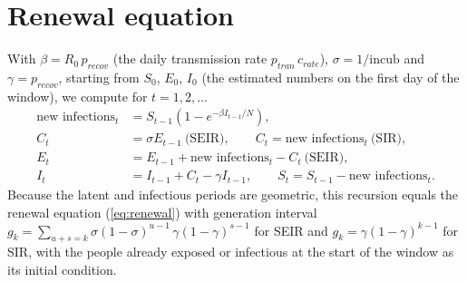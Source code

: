 \documentclass[12pt]{article}
\begin{document}
\section{Renewal equation}\label{app:renewal}

With $\beta = R_0\, p_{recov}$ (the daily transmission rate $p_{tran}\, c_{rate}$), $\sigma = 1/\text{incub}$
and $\gamma = p_{recov}$, starting from $S_0$, $E_0$, $I_0$ (the estimated numbers on the first day of the
window), we compute for $t = 1, 2, \dots$
\begin{align*}
\text{new infections}_t &= S_{t-1}\left(1 - e^{-\beta I_{t-1}/N}\right),\\
C_t &= \sigma E_{t-1} \ \text{(SEIR)}, \qquad C_t = \text{new infections}_t \ \text{(SIR)},\\
E_t &= E_{t-1} + \text{new infections}_t - C_t \ \text{(SEIR)},\\
I_t &= I_{t-1} + C_t - \gamma I_{t-1}, \qquad S_t = S_{t-1} - \text{new infections}_t .
\end{align*}
Because the latent and infectious periods are geometric, this recursion equals the renewal equation
(\ref{eq:renewal}) with generation interval $g_k = \sum_{u+s=k} \sigma(1-\sigma)^{u-1}\, \gamma(1-\gamma)^{s-1}$
for SEIR and $g_k = \gamma(1-\gamma)^{k-1}$ for SIR, with the people already exposed or infectious at the
start of the window as its initial condition.
\end{document}

